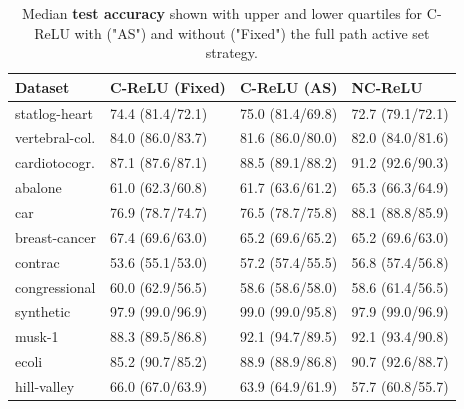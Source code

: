 \begin{table}
	\centering
	\begin{tabular}{llll} \toprule
		\textbf{Dataset} & \textbf{C-ReLU (Fixed)} & \textbf{C-ReLU (AS)} & \textbf{NC-ReLU} \\ \midrule
		statlog-heart    & 74.4 (81.4/72.1)        & 75.0 (81.4/69.8)     & 72.7 (79.1/72.1) \\
		vertebral-col.   & 84.0 (86.0/83.7)        & 81.6 (86.0/80.0)     & 82.0 (84.0/81.6) \\
		cardiotocogr.    & 87.1 (87.6/87.1)        & 88.5 (89.1/88.2)     & 91.2 (92.6/90.3) \\
		abalone          & 61.0 (62.3/60.8)        & 61.7 (63.6/61.2)     & 65.3 (66.3/64.9) \\
		car              & 76.9 (78.7/74.7)        & 76.5 (78.7/75.8)     & 88.1 (88.8/85.9) \\
		breast-cancer    & 67.4 (69.6/63.0)        & 65.2 (69.6/65.2)     & 65.2 (69.6/63.0) \\
		contrac          & 53.6 (55.1/53.0)        & 57.2 (57.4/55.5)     & 56.8 (57.4/56.8) \\
		congressional    & 60.0 (62.9/56.5)        & 58.6 (58.6/58.0)     & 58.6 (61.4/56.5) \\
		synthetic        & 97.9 (99.0/96.9)        & 99.0 (99.0/95.8)     & 97.9 (99.0/96.9) \\
		musk-1           & 88.3 (89.5/86.8)        & 92.1 (94.7/89.5)     & 92.1 (93.4/90.8) \\
		ecoli            & 85.2 (90.7/85.2)        & 88.9 (88.9/86.8)     & 90.7 (92.6/88.7) \\
		hill-valley      & 66.0 (67.0/63.9)        & 63.9 (64.9/61.9)     & 57.7 (60.8/55.7) \\ \bottomrule
	\end{tabular}
	\caption{Median \textbf{test accuracy} shown with upper and lower quartiles for C-ReLU with ("AS") and without ("Fixed") the full path active set strategy.}%
	\label{table:active-set-relu-acc}
\end{table}
